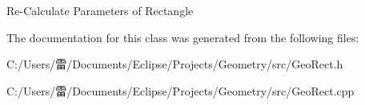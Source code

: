 Re-\/\+Calculate Parameters of Rectangle 

The documentation for this class was generated from the following files\+:\begin{DoxyCompactItemize}
\item 
C\+:/\+Users/雷/\+Documents/\+Eclipse/\+Projects/\+Geometry/src/Geo\+Rect.\+h\item 
C\+:/\+Users/雷/\+Documents/\+Eclipse/\+Projects/\+Geometry/src/Geo\+Rect.\+cpp\end{DoxyCompactItemize}
